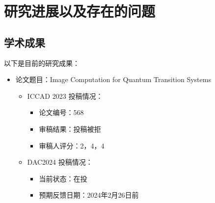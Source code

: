 \section{研究进展以及存在的问题}
\subsection{学术成果}
以下是目前的研究成果：
\begin{itemize}
    \item 论文题目：Image Computation for Quantum Transition Systems
    \begin{itemize}
        \item ICCAD 2023 投稿情况：
        \begin{itemize}
            \item 论文编号：568
            \item 审稿结果：投稿被拒
            \item 审稿人评分：2，4，4
        \end{itemize}
        \item DAC2024 投稿情况：
        \begin{itemize}
            \item 当前状态：在投
            \item 预期反馈日期：2024年2月26日前
        \end{itemize}
    \end{itemize}
\end{itemize}
